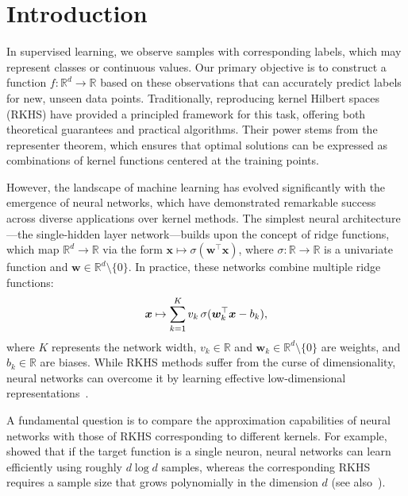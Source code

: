 \section{Introduction}

In supervised learning, we observe samples with corresponding labels, which may represent classes or continuous values. Our primary objective is to construct a function \(f: \mathbb{R}^d \to \mathbb{R}\) based on these observations that can accurately predict labels for new, unseen data points. Traditionally, reproducing kernel Hilbert spaces (RKHS) have provided a principled framework for this task, offering both theoretical guarantees and practical algorithms. Their power stems from the representer theorem, which ensures that optimal solutions can be expressed as combinations of kernel functions centered at the training points.

However, the landscape of machine learning has evolved significantly with the emergence of neural networks, which have demonstrated remarkable success across diverse applications over kernel methods. The simplest neural architecture—the single-hidden layer network—builds upon the concept of ridge functions, which map \(\mathbb{R}^d \to \mathbb{R}\) via the form $\bm{x} \mapsto \sigma(\bm{w}^\top \bm{x})$, where \(\sigma: \mathbb{R} \to \mathbb{R}\) is a univariate function and \(\bm{w} \in \mathbb{R}^d \setminus \{0\}\). In practice, these networks combine multiple ridge functions:\vspace{-1mm}
\[
\bm{x} \mapsto \sum_{k=1}^K v_k\, \sigma(\bm{w}_k^\top \bm{x} - b_k),\vspace{-1mm}
\]
where \(K\) represents the network width, \(v_k \in \mathbb{R}\) and \(\bm{w}_k \in \mathbb{R}^d \setminus \{0\}\) are weights, and \(b_k \in \mathbb{R}\) are biases. While RKHS methods suffer from the curse of dimensionality, neural networks can overcome it by learning effective low-dimensional representations~\citep{ghorbani_curse, luxberg_curse}. %

A fundamental question is to compare the approximation capabilities of neural networks with those of RKHS corresponding to different kernels. For example, \cite{mei_rate} showed that if the target function is a single neuron, neural networks can learn efficiently using roughly \(d \log d\) samples, whereas the corresponding RKHS requires a sample size that grows polynomially in the dimension \(d\) (see also~\citep{yehudai2019power, ghorbani2019limitations}).

